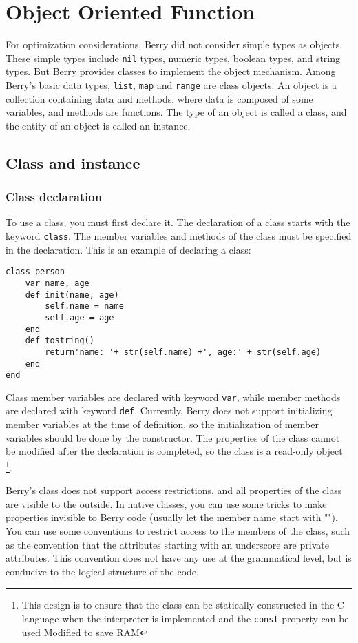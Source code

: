 \chapter {Object Oriented Function}

For optimization considerations, Berry did not consider simple types as objects. These simple types include \texttt{nil} types, numeric types, boolean types, and string types. But Berry provides classes to implement the object mechanism. Among Berry's basic data types, \texttt{list}, \texttt{map} and \texttt{range} are class objects. An object is a collection containing data and methods, where data is composed of some variables, and methods are functions. The type of an object is called a class, and the entity of an object is called an instance.

\section {Class and instance}

\subsection {Class declaration}

To use a class, you must first declare it. The declaration of a class starts with the keyword \texttt{class}. The member variables and methods of the class must be specified in the declaration. This is an example of declaring a class:
\begin{lstlisting}[language=berry, numbers=none]
class person
    var name, age
    def init(name, age)
        self.name = name
        self.age = age
    end
    def tostring()
        return'name: '+ str(self.name) +', age:' + str(self.age)
    end
end
\end{lstlisting}

Class member variables are declared with keyword \texttt{var}, while member methods are declared with keyword \texttt{def}. Currently, Berry does not support initializing member variables at the time of definition, so the initialization of member variables should be done by the constructor. The properties of the class cannot be modified after the declaration is completed, so the class is a read-only object \footnote {This design is to ensure that the class can be statically constructed in the C language when the interpreter is implemented and the \texttt{const} property can be used Modified to save RAM}.

Berry's class does not support access restrictions, and all properties of the class are visible to the outside. In native classes, you can use some tricks to make properties invisible to Berry code (usually let the member name start with ""). You can use some conventions to restrict access to the members of the class, such as the convention that the attributes starting with an underscore are private attributes. This convention does not have any use at the grammatical level, but is conducive to the logical structure of the code.

